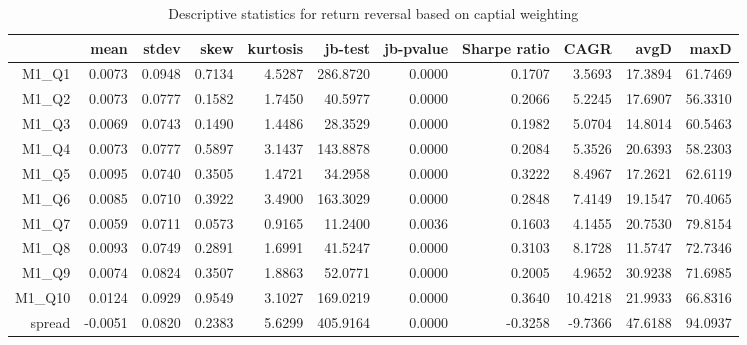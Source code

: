 \begin{table}[ht]
\centering
\begin{tabular}{rrrrrrrrrrr}
  \hline
 & mean & stdev & skew & kurtosis & jb-test & jb-pvalue & Sharpe ratio & CAGR & avgD & maxD \\ 
  \hline
M1\_Q1 & 0.0073 & 0.0948 & 0.7134 & 4.5287 & 286.8720 & 0.0000 & 0.1707 & 3.5693 & 17.3894 & 61.7469 \\ 
  M1\_Q2 & 0.0073 & 0.0777 & 0.1582 & 1.7450 & 40.5977 & 0.0000 & 0.2066 & 5.2245 & 17.6907 & 56.3310 \\ 
  M1\_Q3 & 0.0069 & 0.0743 & 0.1490 & 1.4486 & 28.3529 & 0.0000 & 0.1982 & 5.0704 & 14.8014 & 60.5463 \\ 
  M1\_Q4 & 0.0073 & 0.0777 & 0.5897 & 3.1437 & 143.8878 & 0.0000 & 0.2084 & 5.3526 & 20.6393 & 58.2303 \\ 
  M1\_Q5 & 0.0095 & 0.0740 & 0.3505 & 1.4721 & 34.2958 & 0.0000 & 0.3222 & 8.4967 & 17.2621 & 62.6119 \\ 
  M1\_Q6 & 0.0085 & 0.0710 & 0.3922 & 3.4900 & 163.3029 & 0.0000 & 0.2848 & 7.4149 & 19.1547 & 70.4065 \\ 
  M1\_Q7 & 0.0059 & 0.0711 & 0.0573 & 0.9165 & 11.2400 & 0.0036 & 0.1603 & 4.1455 & 20.7530 & 79.8154 \\ 
  M1\_Q8 & 0.0093 & 0.0749 & 0.2891 & 1.6991 & 41.5247 & 0.0000 & 0.3103 & 8.1728 & 11.5747 & 72.7346 \\ 
  M1\_Q9 & 0.0074 & 0.0824 & 0.3507 & 1.8863 & 52.0771 & 0.0000 & 0.2005 & 4.9652 & 30.9238 & 71.6985 \\ 
  M1\_Q10 & 0.0124 & 0.0929 & 0.9549 & 3.1027 & 169.0219 & 0.0000 & 0.3640 & 10.4218 & 21.9933 & 66.8316 \\ 
  spread & -0.0051 & 0.0820 & 0.2383 & 5.6299 & 405.9164 & 0.0000 & -0.3258 & -9.7366 & 47.6188 & 94.0937 \\ 
   \hline
\end{tabular}
\caption{Descriptive statistics for return reversal based on captial weighting} 
\label{tab:returnRevStats}
\end{table}
